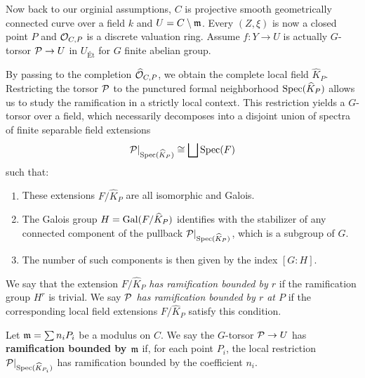 Now back to our orginial assumptions, $C$ is projective smooth geometrically connected curve
over a field $k$ and $U=C\setminus \mathfrak{m}$. Every $(Z, \xi)$ is now a closed point $P$ and $\mathcal{O}_{C, P}$ is a discrete valuation ring. 
Assume $f: Y \to U$ is actually $G$-torsor $\mathcal{P} \to U$ in $U_{\text{\'Et}}$ for $G$ finite abelian group.

By passing to the completion $\widehat{\mathcal{O}}_{C,P}$, we obtain the complete local field $\widehat{K}_P$.
Restricting the torsor $\mathcal{P}$ to the punctured formal neighborhood $\operatorname{Spec}(\widehat{K}_P)$
 allows us to study the ramification in a strictly local context. 
 This restriction yields a $G$-torsor over a field, which necessarily decomposes into a disjoint union of spectra of finite separable field extensions
 $$ \mathcal{P}|_{\operatorname{Spec}(\widehat{K}_P)} \cong \bigsqcup \operatorname{Spec}(F) $$
 such that:
 \begin{enumerate}
    \item These extensions $F/\widehat{K}_P$ are all isomorphic and Galois. 
    \item The Galois group $H = \operatorname{Gal}(F/\widehat{K}_P)$ identifies with the stabilizer of any connected component of the pullback $\mathcal{P}|_{\operatorname{Spec}(\widehat{K}_P)}$, 
     which is a subgroup of $G$. 
    \item  The number of such components is then given by the index $[G:H]$.
 \end{enumerate}

 \begin{definition}\label{definition:local_ramification_boundness:reorg}
    We say that the extension $F/\widehat{K}_P$ \textit{has ramification bounded by $r$} if the ramification group $H^r$ is trivial. 
    We say \textit{$\mathcal{P}$ has ramification bounded by $r$ at $P$} if the corresponding local field extensions $F/\widehat{K}_P$  
    satisfy this condition.
 \end{definition}


\begin{definition}
    Let $\mathfrak{m} = \sum n_i P_i$ be a modulus on $C$. We say the $G$-torsor $\mathcal{P} \to U$ has 
    \textbf{ramification bounded by $\mathfrak{m}$} if, for each point $P_i$, the local restriction 
    $\mathcal{P}|_{\operatorname{Spec}(\widehat{K}_{P_i})}$ has ramification bounded by the coefficient $n_i$.
\end{definition}

